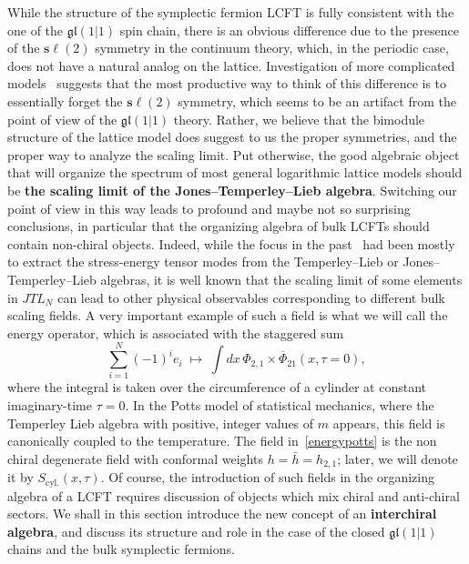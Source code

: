 \documentclass[11pt]{article}
\newcommand{\JTL}[1]{JTL_{#1}}
\newcommand{\nSU}{\boldsymbol{s\ell}}
\newcommand{\gl}{\mathfrak{gl}}
\newcommand{\enrg}{S}
\newcommand{\enrgcyl}{\enrg_{\text{cyl.}}}
\theoremstyle{definition}
\begin{document}
While the structure of the symplectic fermion LCFT  is fully
consistent with the one of the $\gl(1|1)$ spin chain, there is an
obvious difference due to the presence of the $\nSU(2)$ symmetry in
the continuum theory, which, in the periodic case,  does not have a natural analog on the
lattice.  Investigation of more complicated
models~\cite{GRS4} suggests that the most productive way to think of
this difference is to essentially forget the $\nSU(2)$ symmetry, which
seems to be an artifact from the point of view of the $\gl(1|1)$
theory.  Rather, we believe that the bimodule structure of the lattice
model does suggest to us the proper symmetries, and the proper way to
analyze the scaling limit. Put otherwise, the good algebraic object
that will organize the spectrum of most general logarithmic lattice
models should be {\bf the scaling limit of the Jones--Temperley--Lieb
algebra}.  Switching our point of view in this way leads to profound
and maybe not so surprising conclusions, in particular that the
organizing algebra of bulk LCFTs should contain non-chiral objects.
Indeed, while the  focus in the past~\cite{KooSaleur} had been mostly to extract the stress-energy
tensor modes from the
Temperley--Lieb or Jones--Temperley--Lieb algebras, it is well known \cite{ReadSaleur01} that the scaling limit of
some elements in $\JTL{N}$ can lead to other physical observables corresponding
to different bulk scaling fields.  A very important example of
such a field is  what we will call the energy operator, which is  associated
with the staggered sum
%
\begin{equation}\label{energypotts}
\sum_{i=1}^{N} (-1)^i e_i\; \mapsto\; \int dx\, \Phi_{2,1}\times \overline{\Phi}_{21}(x,\tau=0),
\end{equation}
%
where the integral is taken over the
  circumference of a cylinder at constant imaginary-time
  $\tau=0$. In the Potts model of statistical mechanics, where  the Temperley Lieb algebra with positive, integer values of $m$ appears, this field is canonically coupled to the temperature.   The field  in~\eqref{energypotts} is the non chiral degenerate field with conformal weights $h=\bar{h}=h_{2,1}$; later,  we will denote it by
  $\enrgcyl(x,\tau)$.  Of course, the introduction of such fields in the organizing
  algebra of a LCFT requires discussion of objects which mix chiral
  and anti-chiral sectors. We shall in this section introduce the new
  concept of an {\bf interchiral algebra}, and discuss its structure
  and role in the case of  the closed $\gl(1|1)$ chains
  and the bulk symplectic fermions.
\end{document}
